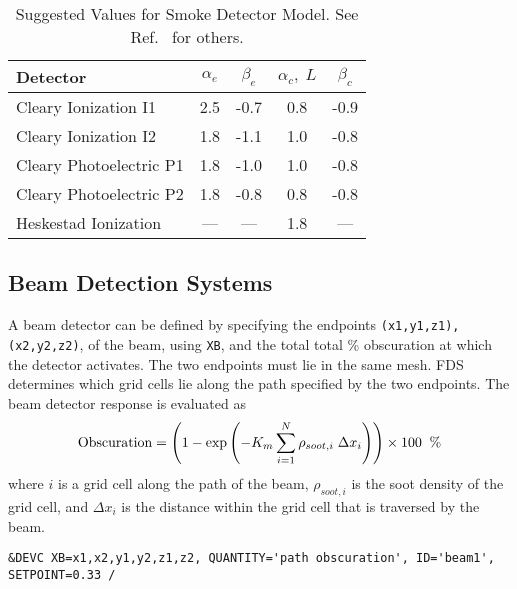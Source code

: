 \documentclass[11pt]{book}
\newcommand{\ct}{\tt\small}
\newcommand{\be}{\begin{equation}}
\newcommand{\ee}{\end{equation}}
\begin{document}
\begin{table}[ht]
\caption{Suggested Values for Smoke Detector Model. See Ref.~\cite{SFPE} for others.}
\vspace{0.1in}
\label{tab:sdvalues}
\begin{center}
\begin{tabular}{|l||c|c|c|c|}
\hline
Detector                      & $\alpha_e$  &  $\beta_e$   &  $\alpha_c, \; L$   &  $\beta_c$  \\ \hline \hline
Cleary Ionization    I1       & 2.5         & -0.7         &  0.8                &  -0.9      \\ \hline
Cleary Ionization    I2       & 1.8         & -1.1         &  1.0                &  -0.8      \\ \hline
Cleary Photoelectric P1       & 1.8         & -1.0         &  1.0                &  -0.8      \\ \hline
Cleary Photoelectric P2       & 1.8         & -0.8         &  0.8                &  -0.8      \\ \hline
Heskestad Ionization          & ---         & ---          &  1.8                &  ---       \\ \hline\end{tabular}
\end{center}
\end{table}


\subsection{Beam Detection Systems}
\label{info:beam_detector}

A beam detector can be defined by specifying the endpoints {\ct (x1,y1,z1),(x2,y2,z2)}, of the beam, using {\ct XB}, and the total
total \% obscuration at which the detector activates.  The two endpoints must lie in the same mesh.  FDS determines which grid
cells lie along the path specified by the two endpoints.  The beam detector response is evaluated as
\be
  \hbox{Obscuration}  = \left(1 - \exp \left( -K_m \sum_{i=1}^N {\rho_{soot,i}\; \Delta x_i} \right)  \right) \times 100  \; \; \hbox{\%}
\ee
where $i$ is a grid cell along the path of the beam, $\rho_{soot,i}$ is the soot density of the grid cell, and $ \Delta x_i$
is the distance within the grid cell that is traversed by the beam.

\footnotesize
\begin{verbatim}
&DEVC XB=x1,x2,y1,y2,z1,z2, QUANTITY='path obscuration', ID='beam1', SETPOINT=0.33 /
\end{verbatim}
\normalsize
\end{document}
